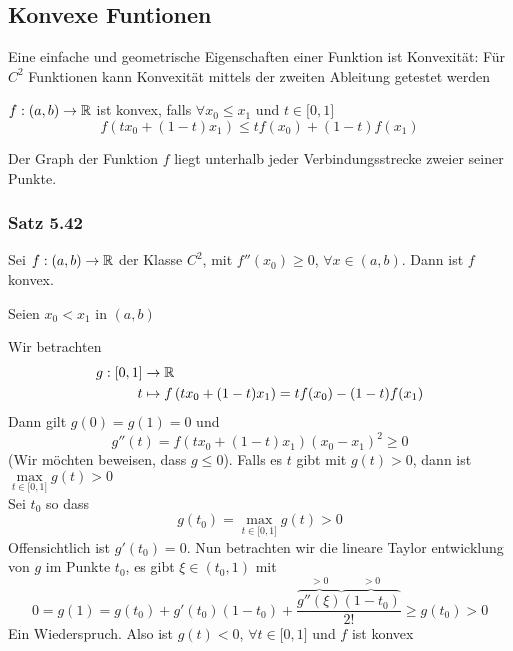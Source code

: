 \subsection*{Konvexe Funtionen}
Eine einfache und geometrische Eigenschaften einer Funktion ist Konvexität: Für $C^2$ Funktionen kann Konvexität mittels der zweiten Ableitung getestet werden

\begin{definition}{5.41}
$f:(a,b)\to\mathbb{R}$ ist konvex, falls $\forall x_0\leq x_1$ und $t\in\lbrack 0,1\rbrack$
\[f\left( tx_0+(1-t)x_1\right)\leq tf(x_0)+(1-t)f(x_1)\]
\end{definition}

Der Graph der Funktion $f$ liegt unterhalb jeder Verbindungsstrecke zweier seiner Punkte.

\subsubsection*{Satz 5.42}
Sei $f:(a,b)\to\mathbb{R}$ der Klasse $C^2$, mit $f''(x_0)\geq 0$, $\forall x\in (a,b)$. Dann ist $f$ konvex.

\begin{beweis}{}
Seien $x_0<x_1$ in $(a,b)$
\begin{center}
\end{center}
Wir betrachten
\begin{align*}
g:\lbrack 0,1\rbrack&\to\mathbb{R}\\
t&\mapsto f\left( tx_0+(1-t)x_1\right) = tf(x_0)-(1-t)f(x_1)
\end{align*}
Dann gilt $g(0)=g(1)=0$ und
\[g''(t)=f\left( tx_0+(1-t)x_1\right)(x_0-x_1)^2\geq 0\]
(Wir möchten beweisen, dass $g\leq 0$). Falls es $t$ gibt mit $g(t)>0$, dann ist $\max\limits_{t\in\lbrack 0,1\rbrack} g(t)>0$\\

\noindent Sei $t_0$ so dass
\[g(t_0)=\max\limits_{t\in\lbrack 0,1\rbrack} g(t)>0\]
Offensichtlich ist $g'(t_0)=0$. Nun betrachten wir die lineare Taylor entwicklung von $g$ im Punkte $t_0$, es gibt $\xi\in(t_0,1)$ mit
\[0=g(1)=g(t_0)+g'(t_0)(1-t_0)+\frac{{\overbrace {g''(\xi )}^{ > 0}\overbrace {(1 - {t_0})}^{ > 0}}}{{2!}}\geq g(t_0)>0\]
Ein Wiederspruch. Also ist $g(t)<0$, $\forall t\in\lbrack 0,1\rbrack$ und $f$ ist konvex
\end{beweis}

